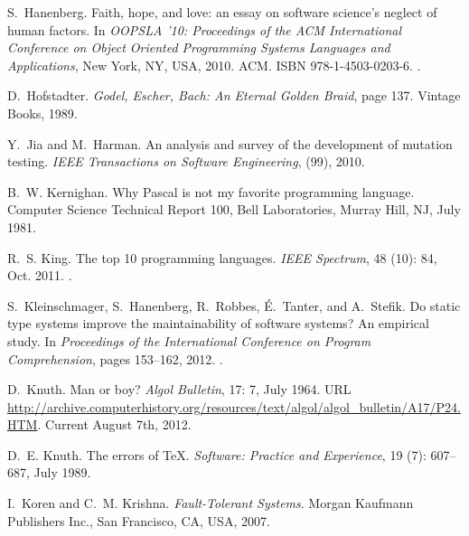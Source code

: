 \documentclass[10pt]{sigplanconf}
\begin{document}
\begin{thebibliography}{35}
S.~Hanenberg.
\newblock Faith, hope, and love: an essay on software science's neglect of
  human factors.
\newblock In \emph{OOPSLA '10: Proceedings of the ACM International Conference
  on Object Oriented Programming Systems Languages and Applications}, New York,
  NY, USA, 2010. ACM.
\newblock ISBN 978-1-4503-0203-6.
\newblock {}.

D.~Hofstadter.
\newblock \emph{Godel, {E}scher, {B}ach: An Eternal Golden Braid}, page 137.
\newblock Vintage Books, 1989.

Y.~Jia and M.~Harman.
\newblock An analysis and survey of the development of mutation testing.
\newblock \emph{IEEE Transactions on Software Engineering},  (99),
  2010.

B.~W. Kernighan.
\newblock Why {P}ascal is not my favorite programming language.
\newblock Computer Science Technical Report 100, Bell Laboratories, Murray
  Hill, NJ, July 1981.

R.~S. King.
\newblock The top 10 programming languages.
\newblock \emph{IEEE Spectrum}, 48 (10): 84, Oct. 2011.
\newblock {}.

S.~Kleinschmager, S.~Hanenberg, R.~Robbes, {\'E}.~Tanter, and A.~Stefik.
\newblock Do static type systems improve the maintainability of software
  systems? {A}n empirical study.
\newblock In \emph{Proceedings of the International Conference on Program
  Comprehension}, pages 153--162, 2012.
\newblock {}.

D.~Knuth.
\newblock Man or boy?
\newblock \emph{Algol Bulletin}, 17: 7, July 1964.
\newblock URL
  \url{http://archive.computerhistory.org/resources/text/algol/algol_bulletin/A17/P24.HTM}.
\newblock Current August 7th, 2012.

D.~E. Knuth.
\newblock The errors of {TeX}.
\newblock \emph{Software: Practice and Experience}, 19 (7):
  607--687, July 1989.

I.~Koren and C.~M. Krishna.
\newblock \emph{Fault-Tolerant Systems}.
\newblock Morgan Kaufmann Publishers Inc., San Francisco, CA, USA, 2007.


\end{thebibliography}
\end{document}
